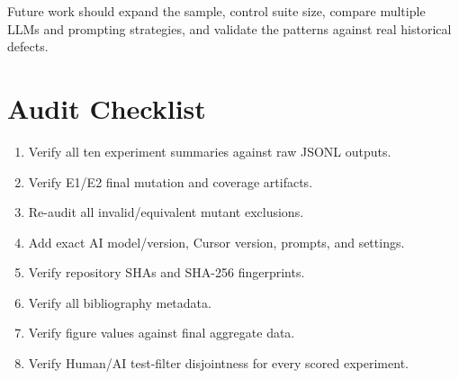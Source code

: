\documentclass[10pt,conference]{IEEEtran}
\begin{document}
Future work should expand the sample, control suite size, compare multiple LLMs and prompting strategies, and validate the patterns against real historical defects.




\appendices
\section{Audit Checklist}
\begin{enumerate}
\item Verify all ten experiment summaries against raw JSONL outputs.
\item Verify E1/E2 final mutation and coverage artifacts.
\item Re-audit all invalid/equivalent mutant exclusions.
\item Add exact AI model/version, Cursor version, prompts, and settings.
\item Verify repository SHAs and SHA-256 fingerprints.
\item Verify all bibliography metadata.
\item Verify figure values against final aggregate data.
\item Verify Human/AI test-filter disjointness for every scored experiment.
\end{enumerate}
\end{document}
